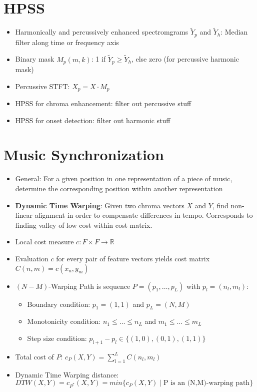 \documentclass{scrartcl}
\begin{document}
\section{HPSS}
\begin{itemize}
    \item
        Harmonically and percussively enhanced spectromgrams $\tilde{Y}_p$ and $\tilde{Y}_h$: Median filter along time or frequency axis
    \item
        Binary mask $M_p(m,k)$: 1 if $\tilde{Y}_p \geq \tilde{Y}_h$, else zero (for percussive harmonic mask)
    \item
        Percussive STFT: $X_p = X \cdot M_p$
    \item
        HPSS for chroma enhancement: filter out percussive stuff
    \item
        HPSS for onset detection: filter out harmonic stuff
\end{itemize}

\section{Music Synchronization}
\begin{itemize}
    \item
        General: For a given position in one representation of a piece of music, determine the corresponding position within another representation
    \item
        \textbf{Dynamic Time Warping}: Given two chroma vectors $X$ and $Y$, find non-linear alignment in order to compensate differences in tempo. Corresponds to finding valley of low cost within cost matrix.
    \item
        Local cost measure $c: F \times F \rightarrow \mathbb{R}$
    \item
        Evaluation $c$ for every pair of feature vectors yields cost matrix $C(n,m) = c(x_n, y_m)$
    \item
        $(N-M)$-Warping Path is sequence $P=(p_1, \dots, p_L)$ with $p_l = (n_l, m_l)$:
        \begin{itemize}
            \item
                Boundary condition: $p_1 = (1,1)$ and $p_L = (N,M)$
            \item
                Monotonicity condition: $n_1 \leq \dots \leq n_L$ and $m_1 \leq \dots \leq m_L$
            \item
                Step size condition: $p_{l+1} - p_l \in \{(1,0), (0,1), (1,1)\}$
        \end{itemize}
    \item
        Total cost of $P$: $c_P(X,Y) = \sum_{l=1}^{L} C(n_l, m_l)$
    \item
        Dynamic Time Warping distance: $ DTW(X,Y) = c_{P^*}(X,Y) = min\{c_P (X,Y) \; | \; \text{P is an (N,M)-warping path}\}$
\end{itemize}
\end{document}
